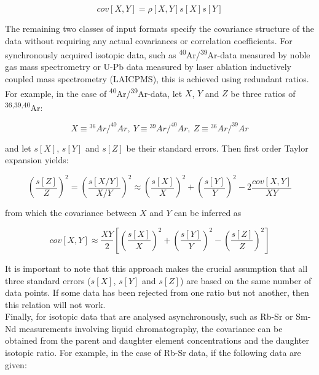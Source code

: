 \documentclass{article}
\begin{document}
\begin{equation*}
  cov[X,Y] = \rho[X,Y] s[X] s[Y]
\end{equation*}

The remaining two classes of input formats specify the covariance
structure of the data without requiring any actual covariances or
correlation coefficients. For synchronously acquired isotopic data,
such as \textsuperscript{40}Ar/\textsuperscript{39}Ar-data measured by
noble gas mass spectrometry or U-Pb data measured by laser ablation
inductively coupled mass spectrometry (LAICPMS), this is achieved
using redundant ratios. For example, in the case of
\textsuperscript{40}Ar/\textsuperscript{39}Ar-data, let $X$, $Y$ and
$Z$ be three ratios of \textsuperscript{36,39,40}Ar:

\[
X \equiv {}^{36}Ar/^{40}Ar
,~Y \equiv {}^{39}Ar/^{40}Ar
,~Z \equiv {}^{36}Ar/^{39}Ar
\]

\noindent and let $s[X]$, $s[Y]$ and $s[Z]$ be their standard errors.
Then first order Taylor expansion yields:

\begin{equation*}
  \left(\frac{s[Z]}{Z}\right)^2 = \left(\frac{s[X/Y]}{X/Y}\right)^2
  \approx \left(\frac{s[X]}{X}\right)^2 + \left(\frac{s[Y]}{Y}\right)^2 -
  2 \frac{cov[X,Y]}{XY}
\end{equation*}

\noindent from which the covariance between $X$ and $Y$ can be
inferred as

\begin{equation*}
  cov[X,Y] \approx \frac{XY}{2}
  \left[
    \left(\frac{s[X]}{X}\right)^2 +
    \left(\frac{s[Y]}{Y}\right)^2 -
    \left(\frac{s[Z]}{Z}\right)^2
    \right]
\end{equation*}

It is important to note that this approach makes the crucial
assumption that all three standard errors ($s[X]$, $s[Y]$ and $s[Z]$)
are based on the same number of data points. If some data has been
rejected from one ratio but not another, then this relation will not
work.\\

Finally, for isotopic data that are analysed asynchronously, such as
Rb-Sr or Sm-Nd measurements involving liquid chromatography, the
covariance can be obtained from the parent and daughter element
concentrations and the daughter isotopic ratio. For example, in the
case of Rb-Sr data, if the following data are given:
\end{document}
